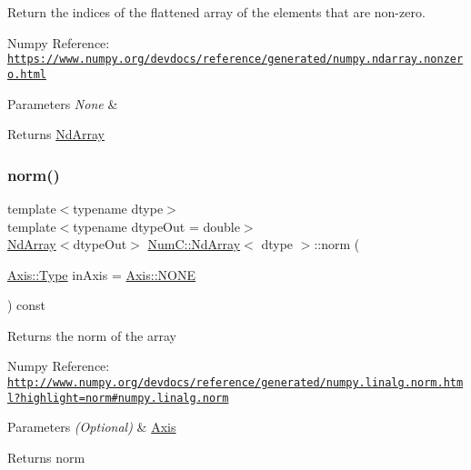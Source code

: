Return the indices of the flattened array of the elements that are non-\/zero.

Numpy Reference\+: \href{https://www.numpy.org/devdocs/reference/generated/numpy.ndarray.nonzero.html}{\tt https\+://www.\+numpy.\+org/devdocs/reference/generated/numpy.\+ndarray.\+nonzero.\+html}


\begin{DoxyParams}{Parameters}
{\em None} & \\
\hline
\end{DoxyParams}
\begin{DoxyReturn}{Returns}
\mbox{\hyperlink{class_num_c_1_1_nd_array}{Nd\+Array}} 
\end{DoxyReturn}
\mbox{\label{class_num_c_1_1_nd_array_a47c3cf20b6d6c9836c8f44cd20db19a2}} 
\subsubsection{\texorpdfstring{norm()}{norm()}}
{\footnotesize\ttfamily template$<$typename dtype$>$ \\
template$<$typename dtype\+Out  = double$>$ \\
\mbox{\hyperlink{class_num_c_1_1_nd_array}{Nd\+Array}}$<$dtype\+Out$>$ \mbox{\hyperlink{class_num_c_1_1_nd_array}{Num\+C\+::\+Nd\+Array}}$<$ dtype $>$\+::norm (\begin{DoxyParamCaption}\item[{\mbox{\hyperlink{struct_num_c_1_1_axis_a8e689044ef1941a03482e730c5e7ebb3}{Axis\+::\+Type}}}]{in\+Axis = {\ttfamily \mbox{\hyperlink{struct_num_c_1_1_axis_a8e689044ef1941a03482e730c5e7ebb3a0ae033c4226f7184bf0050b101e7ed94}{Axis\+::\+N\+O\+NE}}} }\end{DoxyParamCaption}) const\hspace{0.3cm}{\ttfamily [inline]}}

Returns the norm of the array

Numpy Reference\+: \href{http://www.numpy.org/devdocs/reference/generated/numpy.linalg.norm.html?highlight=norm#numpy.linalg.norm}{\tt http\+://www.\+numpy.\+org/devdocs/reference/generated/numpy.\+linalg.\+norm.\+html?highlight=norm\#numpy.\+linalg.\+norm}


\begin{DoxyParams}{Parameters}
{\em (\+Optional)} & \mbox{\hyperlink{struct_num_c_1_1_axis}{Axis}} \\
\hline
\end{DoxyParams}
\begin{DoxyReturn}{Returns}
norm 
\end{DoxyReturn}
\mbox{\label{class_num_c_1_1_nd_array_aad4dd497617c112f0651c063101abf3f}} 
